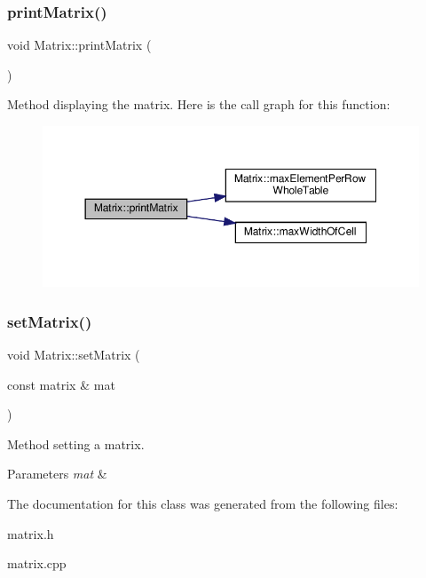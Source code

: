 \subsubsection{\texorpdfstring{print\+Matrix()}{printMatrix()}}
{\footnotesize\ttfamily void Matrix\+::print\+Matrix (\begin{DoxyParamCaption}{ }\end{DoxyParamCaption})}

Method displaying the matrix. Here is the call graph for this function\+:\nopagebreak
\begin{figure}[H]
\begin{center}
\leavevmode
\includegraphics[width=350pt]{class_matrix_aa1967ad240a5ffaf492800044b7275d9_cgraph}
\end{center}
\end{figure}
\mbox{\label{class_matrix_a8c45dd1354fa25e14065cab23f3074c0}} 
\subsubsection{\texorpdfstring{set\+Matrix()}{setMatrix()}}
{\footnotesize\ttfamily void Matrix\+::set\+Matrix (\begin{DoxyParamCaption}\item[{const matrix \&}]{mat }\end{DoxyParamCaption})\hspace{0.3cm}{\ttfamily [inline]}}

Method setting a matrix. 
\begin{DoxyParams}{Parameters}
{\em mat} & \\
\hline
\end{DoxyParams}


The documentation for this class was generated from the following files\+:\begin{DoxyCompactItemize}
\item 
matrix.\+h\item 
matrix.\+cpp\end{DoxyCompactItemize}
